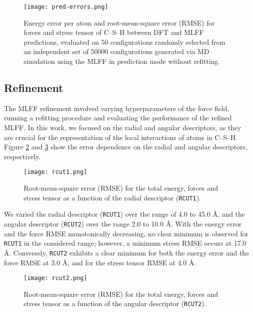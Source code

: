 \begin{figure}[h]
    \centering
    \texttt{[image: pred-errors.png]}
    \caption{
    Energy error per atom and root-mean-square error (RMSE) for forces and stress tensor of C--S--H between DFT and MLFF predictions, evaluated on 50 configurations randomly selected from an independent set of 50000 configurations generated via MD simulation using the MLFF in prediction mode without refitting. 
    }
    \label{pred-errors}
\end{figure}

\subsection{Refinement}
The MLFF refinement involved varying hyperparameters of the force field, running a refitting procedure and evaluating the performance of the refined MLFF. In this work, we focused on the radial and angular descriptors, as they are crucial for the representation of the local interactions of atoms in C--S--H. Figure \ref{rcut1} and \ref{rcut2} show the error dependence on the radial and angular descriptors, respectively. 

\begin{figure}[h]
    \centering
    \texttt{[image: rcut1.png]}
    \caption{
    Root-mean-square error (RMSE) for the total energy, forces and stress tensor as a function of the radial descriptor (\texttt{RCUT1}). 
    }
    \label{rcut1}
\end{figure}

We varied the radial descriptor (\texttt{RCUT1}) over the range of 4.0 to 45.0 Å, and the angular descriptor (\texttt{RCUT2}) over the range 2.0 to 10.0 Å. With the energy error and the force RMSE monotonically decreasing, no clear minimum is observed for \texttt{RCUT1} in the considered range; however, a minimum stress RMSE occurs at 17.0 \AA. Conversely, \texttt{RCUT2} exhibits a clear minimum for both the energy error and the force RMSE at 3.0 \AA, and for the stress tensor RMSE at 4.0 \AA.

\begin{figure}[h]
    \centering
    \texttt{[image: rcut2.png]}
    \caption{
    Root-mean-square error (RMSE) for the total energy, forces and stress tensor as a function of the angular descriptor (\texttt{RCUT2}).
    }
    \label{rcut2}
\end{figure}

